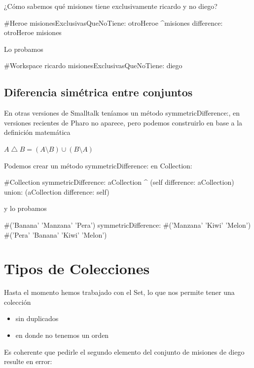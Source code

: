\documentclass[a4paper,12pt]{book}
\begin{document}
¿Cómo sabemos qué misiones tiene exclusivamente ricardo y no diego?

\begin{code}
#Heroe
misionesExclusivasQueNoTiene: otroHeroe
    ^misiones difference: otroHeroe misiones
\end{code}

Lo probamos

\begin{code}
#Workspace
ricardo misionesExclusivasQueNoTiene: diego
\end{code}

\subsection{Diferencia simétrica entre conjuntos}
En otras versiones de Smalltalk teníamos un método symmetricDifference:, en versiones recientes de Pharo
no aparece, pero podemos construirlo en base a la definición matemática 

\begin{mdframed}[style=BoxFrame]
\( A \bigtriangleup B = (A \setminus B) \cup (B \setminus A) \) 
\end{mdframed}

Podemos crear un método symmetricDifference: en Collection:

\begin{code}
#Collection
symmetricDifference: aCollection
	^ (self difference: aCollection) 
	     union: (aCollection difference: self)
\end{code}

y lo probamos

\begin{code}
#('Banana' 'Manzana' 'Pera') 
      symmetricDifference: #('Manzana' 'Kiwi' 'Melon')
      #('Pera' 'Banana' 'Kiwi' 'Melon')
\end{code}

\section{Tipos de Colecciones}
Hasta el momento hemos trabajado con el Set, lo que nos permite tener una colección

\begin{itemize}
 \item sin duplicados
 \item en donde no tenemos un orden
\end{itemize}

Es coherente que pedirle el segundo elemento del conjunto de misiones de diego resulte en error:
\end{document}
